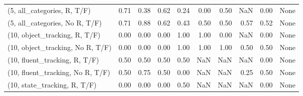 \begin{table*}[h!]
\begin{adjustbox}{width=2\columnwidth,center}
\begin{tabular}{lrrr|rrr|rrr}
(5, all\_categories, R, T/F)          &                      0.71 &                  0.38 &                      0.62 &                          0.24 &                      0.00 &                          0.50 &                                    NaN &                               0.00 &                                  None \\
(5, all\_categories, No R, T/F)       &                      0.71 &                  0.88 &                      0.62 &                          0.43 &                      0.50 &                          0.50 &                                   0.57 &                               0.52 &                                  None \\



\midrule
(10, object\_tracking, R, T/F)         &                      0.00 &                  0.00 &                      0.00 &                          1.00 &                      1.00 &                          0.00 &                                    NaN &                               0.00 &                                  None \\
(10, object\_tracking, No R, T/F)      &                      0.00 &                  0.00 &                      0.00 &                          1.00 &                      1.00 &                          1.00 &                                   0.50 &                               0.50 &                                  None \\
(10, fluent\_tracking, R, T/F)         &                      0.50 &                  0.50 &                      0.50 &                          0.50 &                       NaN &                           NaN &                                    NaN &                               0.00 &                                  None \\
(10, fluent\_tracking, No R, T/F)      &                      0.50 &                  0.75 &                      0.50 &                          0.00 &                       NaN &                           NaN &                                   0.25 &                               0.50 &                                  None \\
(10, state\_tracking, R, T/F)          &                      0.00 &                  0.00 &                      0.00 &                          0.50 &                       NaN &                           NaN &                                    NaN &                               0.00 &                                  None \\

\end{tabular}
\end{adjustbox}
\end{table*}
